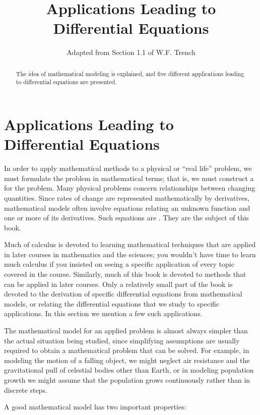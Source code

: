 \documentclass{ximera}
\title{Applications Leading to Differential Equations}
\author{Adapted from Section 1.1 of W.F. Trench}
\begin{document}
\label{Module 3-ABC}

\begin{abstract}
The idea of mathematical modeling is explained, and five different applications leading to differential equations are presented.
\end{abstract}

\maketitle

\section*{Applications Leading to Differential Equations}

In order to apply mathematical methods to a physical or ``real life''
problem, we must  formulate the problem in mathematical
terms; that is, we must construct a  for the
problem. Many physical problems concern relationships between changing
quantities. Since rates of change are represented mathematically by
derivatives, mathematical models often involve equations relating an
unknown function and one or more of its derivatives. Such equations
are  . They are the subject of this
book.

Much of calculus is devoted to learning mathematical techniques that
are applied in later courses in mathematics and the sciences;     you
wouldn't have time to learn much calculus if you insisted on seeing
a specific application of every topic covered in the course.
Similarly, much of this book is devoted to methods that can be applied
in later courses. Only a relatively small part of the book is devoted
to the derivation of specific differential equations from mathematical
models, or relating the differential equations that we study to
specific applications. In this section we mention a few such
applications.

The mathematical model for an applied problem is almost always simpler
than the actual situation being studied, since simplifying assumptions
are usually required to obtain a mathematical problem that can be
solved. For example, in modeling the motion of a falling object, we
might neglect air resistance and the gravitational pull of celestial
bodies other than Earth, or in  modeling  population growth we
might assume that the population grows continuously rather than in
discrete steps.

A good mathematical model has two important properties:
\end{document}
